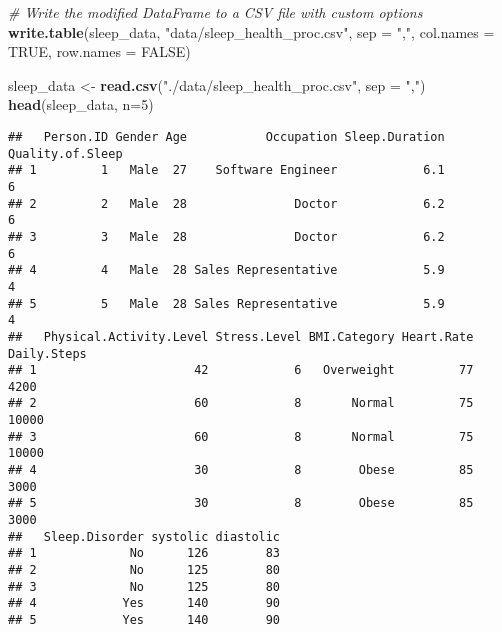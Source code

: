 \documentclass[
]{article}
\newenvironment{Shaded}{\begin{snugshade}}{\end{snugshade}}
\newcommand{\AttributeTok}[1]{\textcolor[rgb]{0.13,0.29,0.53}{#1}}
\newcommand{\CommentTok}[1]{\textcolor[rgb]{0.56,0.35,0.01}{\textit{#1}}}
\newcommand{\ConstantTok}[1]{\textcolor[rgb]{0.56,0.35,0.01}{#1}}
\newcommand{\DecValTok}[1]{\textcolor[rgb]{0.00,0.00,0.81}{#1}}
\newcommand{\FunctionTok}[1]{\textcolor[rgb]{0.13,0.29,0.53}{\textbf{#1}}}
\newcommand{\NormalTok}[1]{#1}
\newcommand{\OtherTok}[1]{\textcolor[rgb]{0.56,0.35,0.01}{#1}}
\newcommand{\StringTok}[1]{\textcolor[rgb]{0.31,0.60,0.02}{#1}}
\begin{document}
\begin{Shaded}
\begin{Highlighting}[]
\CommentTok{\# Write the modified DataFrame to a CSV file with custom options}
\FunctionTok{write.table}\NormalTok{(sleep\_data, }\StringTok{"data/sleep\_health\_proc.csv"}\NormalTok{, }\AttributeTok{sep =} \StringTok{","}\NormalTok{, }\AttributeTok{col.names =} \ConstantTok{TRUE}\NormalTok{, }\AttributeTok{row.names =} \ConstantTok{FALSE}\NormalTok{)}
\end{Highlighting}
\end{Shaded}

\begin{Shaded}
\begin{Highlighting}[]
\NormalTok{sleep\_data }\OtherTok{\textless{}{-}} \FunctionTok{read.csv}\NormalTok{(}\StringTok{"./data/sleep\_health\_proc.csv"}\NormalTok{, }\AttributeTok{sep =} \StringTok{","}\NormalTok{)}
\FunctionTok{head}\NormalTok{(sleep\_data, }\AttributeTok{n=}\DecValTok{5}\NormalTok{)}
\end{Highlighting}
\end{Shaded}

\begin{verbatim}
##   Person.ID Gender Age           Occupation Sleep.Duration Quality.of.Sleep
## 1         1   Male  27    Software Engineer            6.1                6
## 2         2   Male  28               Doctor            6.2                6
## 3         3   Male  28               Doctor            6.2                6
## 4         4   Male  28 Sales Representative            5.9                4
## 5         5   Male  28 Sales Representative            5.9                4
##   Physical.Activity.Level Stress.Level BMI.Category Heart.Rate Daily.Steps
## 1                      42            6   Overweight         77        4200
## 2                      60            8       Normal         75       10000
## 3                      60            8       Normal         75       10000
## 4                      30            8        Obese         85        3000
## 5                      30            8        Obese         85        3000
##   Sleep.Disorder systolic diastolic
## 1             No      126        83
## 2             No      125        80
## 3             No      125        80
## 4            Yes      140        90
## 5            Yes      140        90
\end{verbatim}
\end{document}

